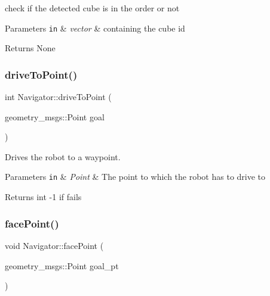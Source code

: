 check if the detected cube is in the order or not 


\begin{DoxyParams}[1]{Parameters}
\mbox{\tt in}  & {\em vector} & containing the cube id\\
\hline
\end{DoxyParams}
\begin{DoxyReturn}{Returns}
None 
\end{DoxyReturn}
\mbox{\label{class_navigator_a3395b9a8421320ae8910af858651a384}} 
\subsubsection{\texorpdfstring{drive\+To\+Point()}{driveToPoint()}}
{\footnotesize\ttfamily int Navigator\+::drive\+To\+Point (\begin{DoxyParamCaption}\item[{geometry\+\_\+msgs\+::\+Point}]{goal }\end{DoxyParamCaption})}



Drives the robot to a waypoint. 


\begin{DoxyParams}[1]{Parameters}
\mbox{\tt in}  & {\em Point} & The point to which the robot has to drive to\\
\hline
\end{DoxyParams}
\begin{DoxyReturn}{Returns}
int -\/1 if fails 
\end{DoxyReturn}
\mbox{\label{class_navigator_a6dcff036582b164e328baa45f8e567c4}} 
\subsubsection{\texorpdfstring{face\+Point()}{facePoint()}}
{\footnotesize\ttfamily void Navigator\+::face\+Point (\begin{DoxyParamCaption}\item[{geometry\+\_\+msgs\+::\+Point}]{goal\+\_\+pt }\end{DoxyParamCaption})}



